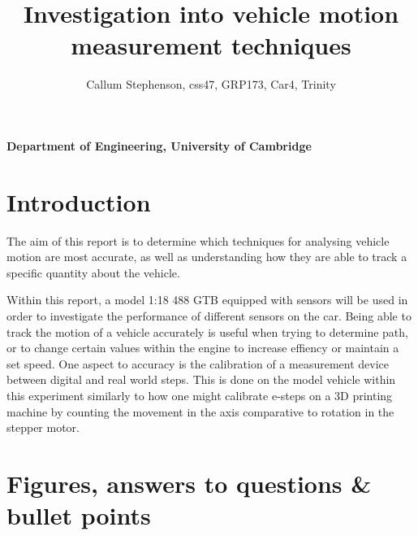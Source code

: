 \documentclass[12pt]{article}
\title{\textbf{Investigation into vehicle motion measurement techniques}}
\author{Callum Stephenson, css47, GRP173, Car4, Trinity}
\date{}
\begin{document}
    \begin{titlepage}
        \maketitle
        \thispagestyle{empty}
        \vspace{13cm}
        \textbf{Department of Engineering, University of Cambridge}
    \end{titlepage}
    \tableofcontents
    \newpage
    \section{Introduction}
    The aim of this report is to determine which techniques for analysing vehicle motion are most accurate, as well as 
    understanding how they are able to track a specific quantity about the vehicle. 
    
    Within this report, a model 1:18 488 GTB equipped with sensors will be used in order to investigate the performance of
    different sensors on the car. Being able to track the motion of a vehicle accurately is useful when trying to determine path,
    or to change certain values within the engine to increase effiency or maintain a set speed. One aspect to accuracy is the calibration of
    a measurement device between digital and real world steps. This is done on the model vehicle within this experiment similarly to
    how one might calibrate e-steps on a 3D printing machine by counting the movement in the axis comparative to rotation in the stepper motor.
    \newpage
    \section{Figures, answers to questions \& bullet points}
\end{document}
